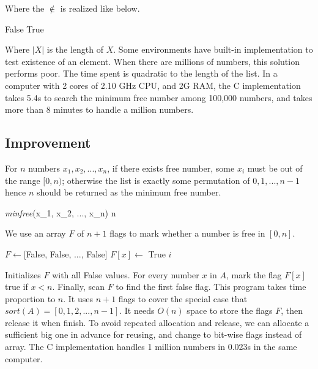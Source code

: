 \documentclass[b5paper]{article}
\begin{document}
Where the $\notin$ is realized like below.

\begin{algorithmic}[1]
      \State \Return False
    \EndIf
  \EndFor
  \State \Return True
\EndFunction
\end{algorithmic}

Where $|X|$ is the length of $X$. Some environments have built-in implementation to test existence of an element. When there are millions of numbers, this solution performs poor. The time spent is quadratic to the length of the list. In a computer with 2 cores of 2.10 GHz CPU, and 2G RAM, the C implementation takes 5.4s to search the minimum free number among 100,000 numbers, and takes more than 8 minutes to handle a million numbers.

\subsection*{Improvement}
For $n$ numbers $x_1, x_2, ..., x_n$, if there exists free number, some $x_i$ must be out of the range $[0, n)$; otherwise the list is exactly some permutation of $0, 1, ..., n - 1$ hence $n$ should be returned as the minimum free number.

\be
\textit{minfree}(x_1, x_2, ..., x_n) \leq n
\label{eq:min-free}
\ee

We use an array $F$ of $n + 1$ flags to mark whether a number is free in $[0, n]$.

\begin{algorithmic}[1]
  \State $F \gets $[False, False, ..., False] 
      \State $F[x] \gets$ True
    \EndIf
  \EndFor
      \State \Return $i$
    \EndIf
  \EndFor
\EndFunction
\end{algorithmic}

Initializes $F$ with all False values. For every number $x$ in $A$, mark the flag $F[x]$ true if $x < n$. Finally, scan $F$ to find the first false flag. This program takes time proportion to $n$. It uses $n + 1$ flags to cover the special case that $sort(A) = [0, 1, 2, ..., n-1]$. It needs $O(n)$ space to store the flags $F$, then release it when finish. To avoid repeated allocation and release, we can allocate a sufficient big one in advance for reusing, and change to bit-wise flags instead of array. The C implementation handles 1 million numbers in 0.023s in the same computer.
\end{document}
